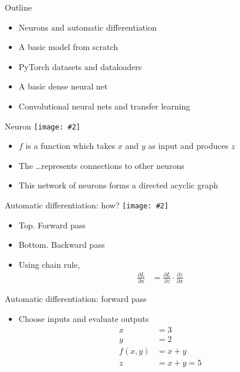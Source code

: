 \documentclass[hyperref={pdfpagelabels=false},12pt]{beamer}
\newcommand{\ig}[2]{\texttt{[image: \#2]}}
\begin{document}
\begin{frame}{Outline}
  \begin{itemize}
    \item Neurons and automatic differentiation
    \item A basic model from scratch
    \item PyTorch datasets and dataloaders
    \item A basic dense neural net
    \item Convolutional neural nets and transfer learning
  \end{itemize}
\end{frame}

\begin{frame}{Neuron}
  \centering
  \ig{0.75}{figures/neuron.png}
  \begin{itemize}
      \item $f$ is a function which takes $x$ and $y$ as input and produces $z$
      \item The \dots represents connections to other neurons
      \item This network of neurons forms a directed acyclic graph
  \end{itemize}
\end{frame}

\begin{frame}{Automatic differentiation: how?}
  \centering
  \ig{0.5}{figures/autograd.png}
  \begin{itemize}
      \item Top. Forward pass
      \item Bottom. Backward pass
      \item Using chain rule,
        \begin{align*}
          \frac{\partial L}{\partial x} &= \frac{\partial L}{\partial z} \cdot
                    \frac{\partial z}{\partial x}
        \end{align*}
  \end{itemize}
\end{frame}

\begin{frame}{Automatic differentiation: forward pass}
  \begin{itemize}
    \item Choose inputs and evaluate outputs
      \begin{align*}
        x &= 3 \\
        y &= 2 \\
        f(x, y) &= x + y \\
        z &= x + y = 5
      \end{align*}
  \end{itemize}
\end{frame}
\end{document}
